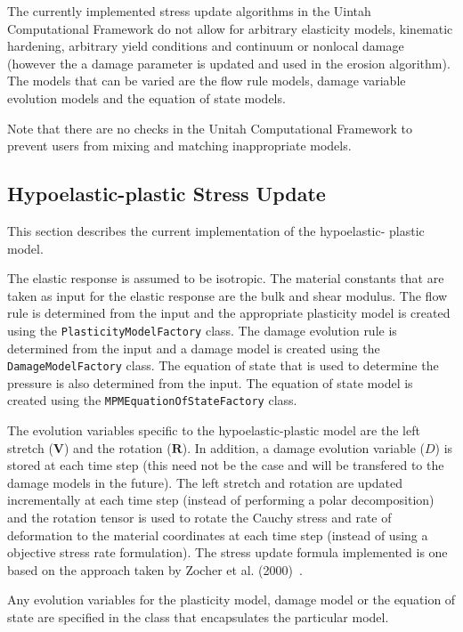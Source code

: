 \documentclass[10pt]{article}
\begin{document}
  The currently implemented stress update algorithms in the Uintah
  Computational Framework do not allow for arbitrary elasticity models,
  kinematic hardening, arbitrary yield conditions and continuum or 
  nonlocal damage (however the a damage parameter is updated and 
  used in the erosion algorithm).  The models that can be varied
  are the flow rule models, damage variable evolution models and the
  equation of state models.

  Note that there are no checks in the Unitah Computational Framework
  to prevent users from mixing and matching inappropriate models.

  \subsection{Hypoelastic-plastic Stress Update}
  This section describes the current implementation of the hypoelastic-
  plastic model.

  The elastic response is assumed to be isotropic.  The material
  constants that are taken as input for the elastic response are the
  bulk and shear modulus.  The flow rule is determined from the input
  and the appropriate plasticity model is created using the 
  \verb+PlasticityModelFactory+ class.  The damage evolution rule
  is determined from the input and a damage model is created using
  the \verb+DamageModelFactory+ class.  The equation of state 
  that is used to determine the pressure is also determined from the
  input.  The equation of state model is created using the 
  \verb+MPMEquationOfStateFactory+ class.

  The evolution variables specific to the hypoelastic-plastic model
  are the left stretch ($\mathbf{V}$) and the rotation ($\mathbf{R}$).
  In addition, a damage evolution variable ($D$) is stored at each time 
  step (this need not be the case and will be transfered to the 
  damage models in the future).  The left stretch and rotation are 
  updated incrementally at each
  time step (instead of performing a polar decomposition) and the 
  rotation tensor is used to rotate the Cauchy stress and rate of deformation
  to the material coordinates at each time step (instead of using a 
  objective stress rate formulation).  The stress update formula implemented
  is one based on the approach taken by  Zocher et al. (2000)~\cite{Zocher2000}.  

  Any evolution variables for the plasticity model, damage model or the
  equation of state are specified in the class that encapsulates the 
  particular model.  
\end{document}
